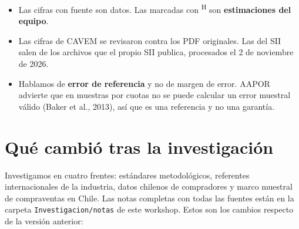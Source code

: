 \documentclass[11pt,a4paper]{article}
\newcommand{\hyp}{\textsuperscript{\textsf{\scriptsize H}}}
\begin{document}
\begin{notebox}[title=Cómo leer este documento]
\begin{itemize}
\item Las cifras con fuente son datos. Las marcadas con \hyp{} son \textbf{estimaciones del equipo}.
\item Las cifras de CAVEM se revisaron contra los PDF originales. Las del SII salen de los archivos que el propio SII publica, procesados el 2 de noviembre de 2026.
\item Hablamos de \textbf{error de referencia} y no de margen de error. AAPOR advierte que en muestras por cuotas no se puede calcular un error muestral válido (Baker et al., 2013), así que es una referencia y no una garantía.
\end{itemize}
\end{notebox}

{\small\setcounter{tocdepth}{1}\setlength{\parskip}{0pt}\tableofcontents}

\section{Qué cambió tras la investigación}\label{sec:cambios}

Investigamos en cuatro frentes: estándares metodológicos, referentes internacionales de la industria, datos chilenos de compradores y marco muestral de compraventas en Chile. Las notas completas con todas las fuentes están en la carpeta \texttt{Investigacion/notas} de este workshop. Estos son los cambios respecto de la versión anterior:
\end{document}
